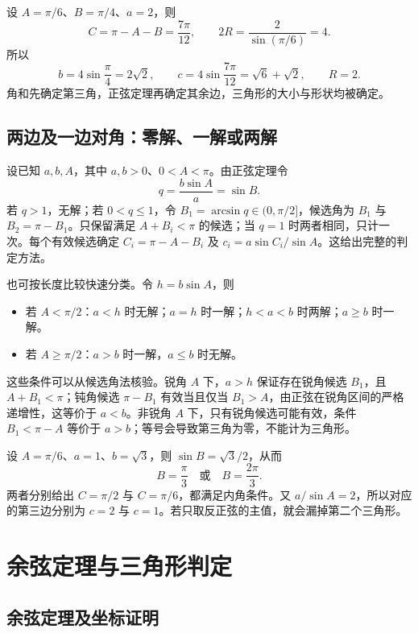 \documentclass[UTF8,12pt,a4paper,fontset=fandol]{ctexart}
\begin{document}
\begin{example}[已知两角和一边]
设 $A=\pi/6$、$B=\pi/4$、$a=2$，则
\[
  C=\pi-A-B=\frac{7\pi}{12},\qquad
  2R=\frac2{\sin(\pi/6)}=4.
\]
所以
\[
  b=4\sin\frac\pi4=2\sqrt2,\qquad
  c=4\sin\frac{7\pi}{12}=\sqrt6+\sqrt2,\qquad R=2.
\]
角和先确定第三角，正弦定理再确定其余边，三角形的大小与形状均被确定。
\end{example}

\subsection{两边及一边对角：零解、一解或两解}
\label{subsec:trig-ssa}

设已知 $a,b,A$，其中 $a,b>0$、$0<A<\pi$。由正弦定理令
\[
  q=\frac{b\sin A}{a}=\sin B.
\]
若 $q>1$，无解；若 $0<q\le1$，令 $B_1=\arcsin q\in(0,\pi/2]$，候选角为 $B_1$ 与 $B_2=\pi-B_1$。只保留满足 $A+B_i<\pi$ 的候选；当 $q=1$ 时两者相同，只计一次。每个有效候选确定 $C_i=\pi-A-B_i$ 及 $c_i=a\sin C_i/\sin A$。这给出完整的判定方法。

也可按长度比较快速分类。令 $h=b\sin A$，则
\begin{itemize}
  \item 若 $A<\pi/2$：$a<h$ 时无解；$a=h$ 时一解；$h<a<b$ 时两解；$a\ge b$ 时一解。
  \item 若 $A\ge\pi/2$：$a>b$ 时一解，$a\le b$ 时无解。
\end{itemize}
这些条件可以从候选角法核验。锐角 $A$ 下，$a>h$ 保证存在锐角候选 $B_1$，且 $A+B_1<\pi$；钝角候选 $\pi-B_1$ 有效当且仅当 $B_1>A$，由正弦在锐角区间的严格递增性，这等价于 $a<b$。非锐角 $A$ 下，只有锐角候选可能有效，条件 $B_1<\pi-A$ 等价于 $a>b$；等号会导致第三角为零，不能计为三角形。

\begin{example}[出现两个三角形]
设 $A=\pi/6$、$a=1$、$b=\sqrt3$，则 $\sin B=\sqrt3/2$，从而
\[
  B=\frac\pi3\quad\text{或}\quad B=\frac{2\pi}3.
\]
两者分别给出 $C=\pi/2$ 与 $C=\pi/6$，都满足内角条件。又 $a/\sin A=2$，所以对应的第三边分别为 $c=2$ 与 $c=1$。若只取反正弦的主值，就会漏掉第二个三角形。
\end{example}

\section{余弦定理与三角形判定}
\label{sec:trig-cosine-law}

\subsection{余弦定理及坐标证明}
\end{document}
